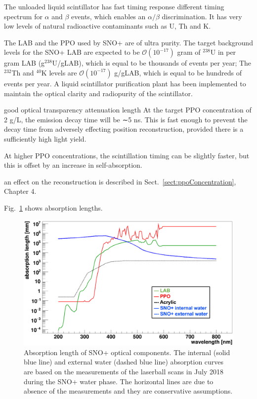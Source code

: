 The unloaded liquid scintillator has fast timing response different timing spectrum for $\alpha$ and $\beta$ events, which enables an $\alpha/\beta$ discrimination. It has very low levels of natural radioactive contaminants such as U, Th and K.

The LAB and the PPO used by SNO+ are of ultra purity. The target background levels for the SNO+ LAB are expected to be $\mathcal O(10^{-17})$ gram of $^{238}$U in per gram LAB (g$^{238}$U/gLAB), which is equal to be thousands of events per year;
The $^{232}$Th and $^{40}$K levels are $\mathcal O(10^{-17})$ g/gLAB, which is equal to be hundreds of events per year\cite{snop_jinst,markchen_bkg}. A liquid scintillator purification plant has been implemented to maintain the optical clarity and radiopurity of the scintillator\cite{snop_jinst}.

good optical transparency  attenuation length   
  At the target PPO concentration of 2 g/L, the emission decay time will be ∼5 ns. This is fast
  enough to prevent the decay time from adversely effecting position reconstruction, provided there is
  a sufficiently high light yield. 

At higher PPO concentrations, the scintillation timing can be slightly
  faster, but this is offset by an increase in self-absorption.

an effect on the reconstruction is described in Sect.~\ref{sect:ppoConcentration}, Chapter 4.
    
Fig.~\ref{absLength} shows absorption lengths.

\begin{figure}[!htb]
	\centering
	\includegraphics[width=12cm]{absLength.png}
	\caption[Absorption length of SNO+ optical components.]{Absorption length of SNO+ optical components. The internal (solid blue line) and external water (dashed blue line) absorption curves are based on the measurements of the laserball scans in July 2018 during the SNO+ water phase. The horizontal lines are due to absence of the measurements and they are conservative assumptions.}
	\label{absLength}
\end{figure}


